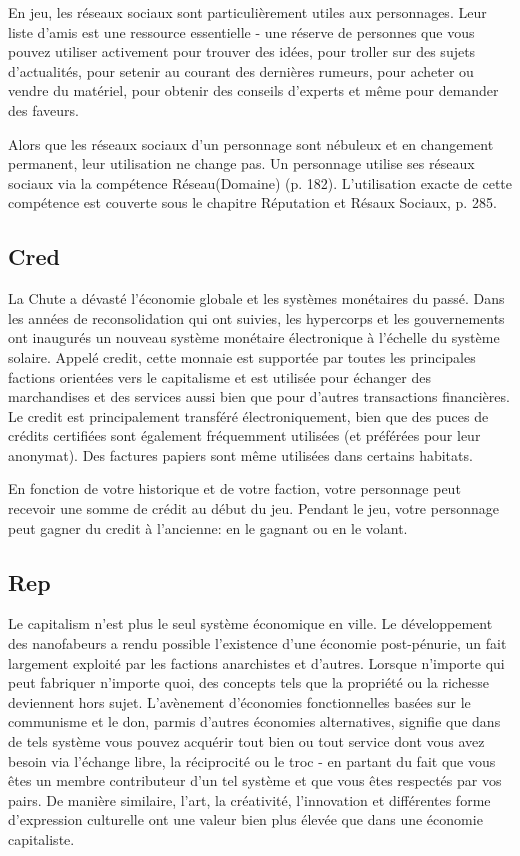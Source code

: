En jeu, les réseaux sociaux sont particulièrement utiles aux personnages. Leur liste d'amis est une ressource essentielle - une réserve de personnes que vous pouvez utiliser activement pour trouver des idées, pour troller sur des sujets d'actualités, pour setenir au courant des dernières rumeurs, pour acheter ou vendre du matériel, pour obtenir des conseils d'experts et même pour demander des faveurs. 

Alors que les réseaux sociaux d'un personnage sont nébuleux et en changement permanent, leur utilisation ne change pas. Un personnage utilise ses réseaux sociaux via la compétence Réseau(Domaine) (p. 182). L'utilisation exacte de cette compétence est couverte sous le chapitre Réputation et Résaux Sociaux, p. 285. 

\subsection{Cred} \label{sec:cred} 

La Chute a dévasté l'économie globale et les systèmes monétaires du passé. Dans les années de reconsolidation qui ont suivies, les hypercorps et les gouvernements ont inaugurés un nouveau système monétaire électronique à l'échelle du système solaire. Appelé credit, cette monnaie est supportée par toutes les principales factions orientées vers le capitalisme et est utilisée pour échanger des marchandises et des services aussi bien que pour d'autres transactions financières. Le credit est principalement transféré électroniquement, bien que des puces de crédits certifiées sont également fréquemment utilisées (et préférées pour leur anonymat). Des factures papiers sont même utilisées dans certains habitats. 

En fonction de votre historique et de votre faction, votre personnage peut recevoir une somme de crédit au début du jeu. Pendant le jeu, votre personnage peut gagner du credit à l'ancienne: en le gagnant ou en le volant. 

\subsection{Rep} \label{sec:rep} 

Le capitalism n'est plus le seul système économique en ville. Le développement des nanofabeurs a rendu possible l'existence d'une économie post-pénurie, un fait largement exploité par les factions anarchistes et d'autres. Lorsque n'importe qui peut fabriquer n'importe quoi, des concepts tels que la propriété ou la richesse deviennent hors sujet. L'avènement d'économies fonctionnelles basées sur le communisme et le don, parmis d'autres économies alternatives, signifie que dans de tels système vous pouvez acquérir tout bien ou tout service dont vous avez besoin via l'échange libre, la réciprocité ou le troc - en partant du fait que vous êtes un membre contributeur d'un tel système et que vous êtes respectés par vos pairs. De manière similaire, l'art, la créativité, l'innovation et différentes forme d'expression culturelle ont une valeur bien plus élevée que dans une économie capitaliste. 

